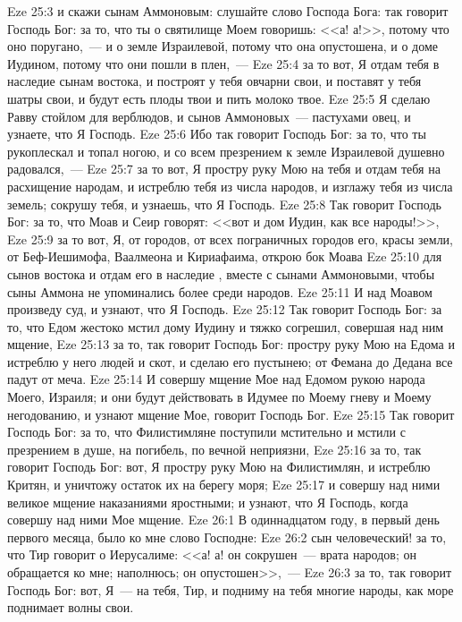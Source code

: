 \vs Eze 25:3 и скажи сынам Аммоновым: слушайте слово Господа Бога: так говорит Господь Бог: за то, что ты о святилище Моем говоришь: <<а! а!>>, потому что оно поругано,~--- и о земле Израилевой, потому что она опустошена, и о доме Иудином, потому что они пошли в плен,~---
\vs Eze 25:4 за то вот, Я отдам тебя в наследие сынам востока, и построят у тебя овчарни свои, и поставят у тебя шатры свои, и будут есть плоды твои и пить молоко твое.
\vs Eze 25:5 Я сделаю Равву стойлом для верблюдов, и сынов Аммоновых~--- пастухами овец, и узнаете, что Я Господь.
\vs Eze 25:6 Ибо так говорит Господь Бог: за то, что ты рукоплескал и топал ногою, и со всем презрением к земле Израилевой душевно радовался,~---
\vs Eze 25:7 за то вот, Я простру руку Мою на тебя и отдам тебя на расхищение народам, и истреблю тебя из числа народов, и изглажу тебя из числа земель; сокрушу тебя, и узнаешь, что Я Господь.
\vs Eze 25:8 Так говорит Господь Бог: за то, что Моав и Сеир говорят: <<вот и дом Иудин, как все народы!>>,
\vs Eze 25:9 за то вот, Я,  от городов, от всех пограничных городов его, красы земли, от Беф-Иешимофа, Ваалмеона и Кириафаима, открою бок Моава
\vs Eze 25:10 для сынов востока и отдам его в наследие , вместе с сынами Аммоновыми, чтобы сыны Аммона не упоминались более среди народов.
\vs Eze 25:11 И над Моавом произведу суд, и узнают, что Я Господь.
\vs Eze 25:12 Так говорит Господь Бог: за то, что Едом жестоко мстил дому Иудину и тяжко согрешил, совершая над ним мщение,
\vs Eze 25:13 за то, так говорит Господь Бог: простру руку Мою на Едома и истреблю у него людей и скот, и сделаю его пустынею; от Фемана до Дедана все падут от меча.
\vs Eze 25:14 И совершу мщение Мое над Едомом рукою народа Моего, Израиля; и они будут действовать в Идумее по Моему гневу и Моему негодованию, и узнают мщение Мое, говорит Господь Бог.
\vs Eze 25:15 Так говорит Господь Бог: за то, что Филистимляне поступили мстительно и мстили с презрением в душе, на погибель, по вечной неприязни,
\vs Eze 25:16 за то, так говорит Господь Бог: вот, Я простру руку Мою на Филистимлян, и истреблю Критян, и уничтожу остаток их на берегу моря;
\vs Eze 25:17 и совершу над ними великое мщение наказаниями яростными; и узнают, что Я Господь, когда совершу над ними Мое мщение.
\vs Eze 26:1 В одиннадцатом году, в первый день первого месяца, было ко мне слово Господне:
\vs Eze 26:2 сын человеческий! за то, что Тир говорит о Иерусалиме: <<а! а! он сокрушен~--- врата народов; он обращается ко мне; наполнюсь; он опустошен>>,~---
\vs Eze 26:3 за то, так говорит Господь Бог: вот, Я~--- на тебя, Тир, и подниму на тебя многие народы, как море поднимает волны свои.
